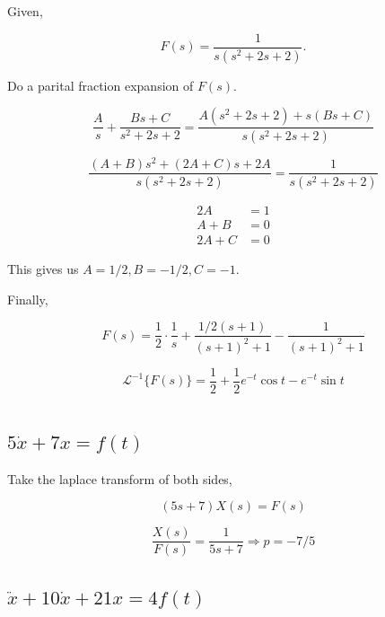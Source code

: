 \documentclass[12pt]{article}
\numberwithin{equation}{section}
\begin{document}
  Given,

  \[
      F(s) = \frac{1}{s (s ^2 + 2s + 2)}
    .\]

  Do a parital fraction expansion of $ F(s). $

  \begin{equation}
    \frac{A}{s} + \frac{Bs + C}{s ^2 + 2s + 2} = \frac{A(s^2 + 2s +2) + s(Bs + C)}{s(s ^2 + 2s + 2)}
  \end{equation}

  \begin{equation}
    \frac{(A + B)s ^2 + (2A + C)s + 2A}{s(s^2 + 2s + 2)} = \frac{1}{s(s^2 + 2s + 2)}
  \end{equation}

  \begin{align*}
    2A &= 1 \\
    A + B &= 0 \\
    2A + C &= 0
  \end{align*}

  This gives us $ A = 1/2, B = -1/2, C = -1. $

  Finally,

  \begin{equation}
    F(s) = \frac{1}{2} \cdot \frac{1}{s} + \frac{1/2 (s + 1)}{(s + 1)^2 + 1} - \frac{1}{(s + 1)^2 + 1}
  \end{equation}

  \begin{equation}
    \mathcal{L}^{-1}\{F(s)\} = \frac{1}{2} + \frac{1}{2} e^{-t}\cos t - e^{-t}\sin t
  \end{equation}

  \section{}

  \subsection{$ 5\dot x + 7x = f(t) $}

  Take the laplace transform of both sides,

  \begin{equation}
    (5s + 7)X(s) = F(s)
  \end{equation}

  \begin{equation}
    \frac{X(s)}{F(s)} = \frac{1}{5s + 7} \Rightarrow p = -7/5
  \end{equation}

  \subsection{$ \ddot x + 10\dot x + 21x = 4f(t)$}
\end{document}
